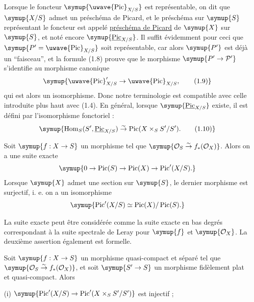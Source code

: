 Lorsque le foncteur $\symup{\mathop{\text{\uwave{Pic}}}\nolimits_{X/S}}$ est représentable, on dit que
$\symup{X/S}$ admet un préschéma de Picard, et le préschéma sur $\symup{S}$ représentant le
foncteur est appelé \uline{préschéma de Picard} de $\symup{X}$ sur $\symup{S}$, et noté encore
$\symup{\underline{\operatorname{Pic}}_{X/S}}$. Il suffit évidemment pour ceci que
$\symup{P'=\mathop{\text{\uwave{Pic}}}\nolimits_{X/S}}$ soit représentable, car alors $\symup{P'}$ est déjà un
``faisceau'', et la formule (1.8) prouve que le morphisme
$\symup{P'\to\mathcal P'}$ s'identifie au morphisme canonique
\begin{equation}
\symup{\mathop{\text{\uwave{Pic}}}\nolimits'_{X/S}\to\mathop{\text{\uwave{Pic}}}\nolimits_{X/S},
\tag{1.9}}
\end{equation}
qui est alors un isomorphisme. Donc notre terminologie est compatible avec
celle introduite plus haut avec (1.4). En général, lorsque
$\symup{\underline{\operatorname{Pic}}_{X/S}}$ existe, il est défini par l'isomorphisme fonctoriel :
\begin{equation}
\symup{\operatorname{Hom}_S(S',\underline{\operatorname{Pic}}_{X/S})\overset{\sim}{\to}
\operatorname{Pic}(X\times_SS'/S').
\tag{1.10}}
\end{equation}


 Soit $\symup{f:X\to S}$ un morphisme tel que
$\symup{\mathcal O_S\overset{\sim}{\to}f_*(\mathcal O_X)}$. Alors on a une suite exacte
\[
\symup{0\to\operatorname{Pic}(S)\to\operatorname{Pic}(X)
\to\operatorname{Pic}'(X/S).}
\]
Lorsque $\symup{X}$ admet une section sur $\symup{S}$, le dernier morphisme est surjectif, i. e.
on a un isomorphisme
\[
\symup{\operatorname{Pic}'(X/S)\simeq
\operatorname{Pic}(X)/\operatorname{Pic}(S).}
\]

La suite exacte peut être considérée comme la suite exacte en bas degrés
correspondant à la suite spectrale de Leray pour $\symup{f}$ et $\symup{\mathcal O_X}$. La
deuxième assertion également est formelle.

 Soit $\symup{f:X\to S}$ un morphisme
quasi-compact et séparé tel que
$\symup{\mathcal O_S\overset{\sim}{\to}f_*(\mathcal O_X)}$, et soit
$\symup{S'\to S}$ un morphisme fidèlement plat et quasi-compact. Alors

\noindent (i) $\symup{\operatorname{Pic}'(X/S)\to
\operatorname{Pic}'(X\times_SS'/S')}$ est injectif ;

